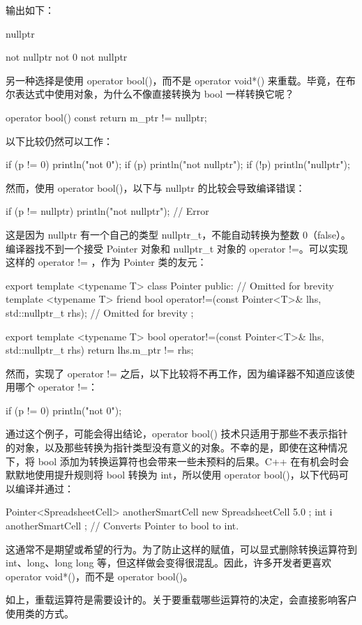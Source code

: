 输出如下：

\begin{shell}
nullptr

not nullptr
not 0
not nullptr
\end{shell}

另一种选择是使用 operator bool()，而不是 operator void*() 来重载。毕竟，在布尔表达式中使用对象，为什么不像直接转换为 bool 一样转换它呢？

\begin{cpp}
operator bool() const { return m_ptr != nullptr; }
\end{cpp}

以下比较仍然可以工作：

\begin{cpp}
if (p != 0) { println("not 0"); }
if (p)      { println("not nullptr"); }
if (!p)     { println("nullptr"); }
\end{cpp}

然而，使用 operator bool()，以下与 nullptr 的比较会导致编译错误：

\begin{cpp}
if (p != nullptr) { println("not nullptr"); } // Error
\end{cpp}

这是因为 nullptr 有一个自己的类型 nullptr\_t，不能自动转换为整数 0（false）。编译器找不到一个接受 Pointer 对象和 nullptr\_t 对象的 operator !=。可以实现这样的 operator != ，作为 Pointer 类的友元：

\begin{cpp}
export template <typename T>
class Pointer
{
    public:
        // Omitted for brevity
        template <typename T>
        friend bool operator!=(const Pointer<T>& lhs, std::nullptr_t rhs);
        // Omitted for brevity
};

export template <typename T>
bool operator!=(const Pointer<T>& lhs, std::nullptr_t rhs)
{
    return lhs.m_ptr != rhs;
}
\end{cpp}

然而，实现了 operator != 之后，以下比较将不再工作，因为编译器不知道应该使用哪个 operator !=：

\begin{cpp}
if (p != 0) { println("not 0"); }
\end{cpp}

通过这个例子，可能会得出结论，operator bool() 技术只适用于那些不表示指针的对象，以及那些转换为指针类型没有意义的对象。不幸的是，即使在这种情况下，将 bool 添加为转换运算符也会带来一些未预料的后果。C++ 在有机会时会默默地使用提升规则将 bool 转换为 int，所以使用 operator bool()，以下代码可以编译并通过：

\begin{cpp}
Pointer<SpreadsheetCell> anotherSmartCell { new SpreadsheetCell { 5.0 } };
int i { anotherSmartCell }; // Converts Pointer to bool to int.
\end{cpp}

这通常不是期望或希望的行为。为了防止这样的赋值，可以显式删除转换运算符到 int、long、long long 等，但这样做会变得很混乱。因此，许多开发者更喜欢 operator void*()，而不是 operator bool()。

如上，重载运算符是需要设计的。关于要重载哪些运算符的决定，会直接影响客户使用类的方式。

